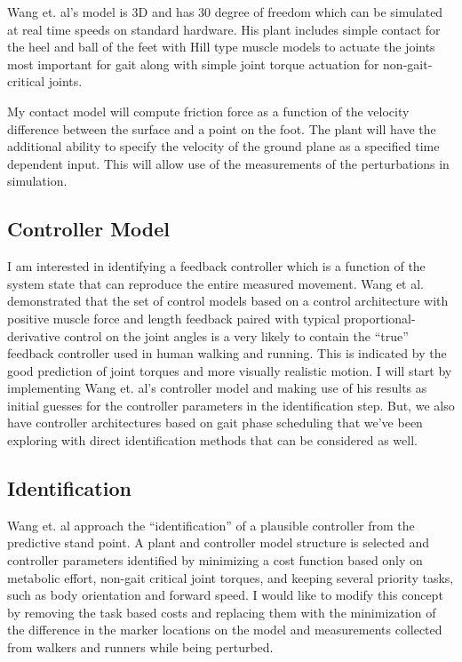 \documentclass[11pt]{article}
\begin{document}
Wang et. al's model is 3D and has 30 degree of freedom which can be simulated
at real time speeds on standard hardware. His plant includes simple contact for
the heel and ball of the feet with Hill type muscle models to actuate the
joints most important for gait along with simple joint torque actuation for
non-gait-critical joints.

My contact model will compute friction force as a function of the velocity
difference between the surface and a point on the foot. The plant will have the
additional ability to specify the velocity of the ground plane as a specified
time dependent input. This will allow use of the measurements of the
perturbations in simulation.

\subsection*{Controller Model}

I am interested in identifying a feedback controller which is a function of the
system state that can reproduce the entire measured movement. Wang et al.
demonstrated that the set of control models based on a control architecture
with positive muscle force and length feedback paired with typical
proportional-derivative control on the joint angles is a very likely to contain
the ``true'' feedback controller used in human walking and running. This is
indicated by the good prediction of joint torques and more visually realistic
motion. I will start by implementing Wang et. al's controller model and making
use of his results as initial guesses for the controller parameters in the
identification step. But, we also have controller architectures based on gait
phase scheduling that we've been exploring with direct identification methods
that can be considered as well.

\subsection*{Identification}

Wang et. al  approach the ``identification'' of a plausible controller from the
predictive stand point. A plant and controller model structure is selected and
controller parameters identified by minimizing a cost function based only on metabolic 
effort, non-gait critical joint torques, and keeping several priority tasks, such 
as body orientation and forward speed. I would like to modify this concept by removing 
the task based costs and replacing them with the minimization of the difference in 
the marker locations on the model and measurements collected from walkers and runners 
while being perturbed.
\end{document}
